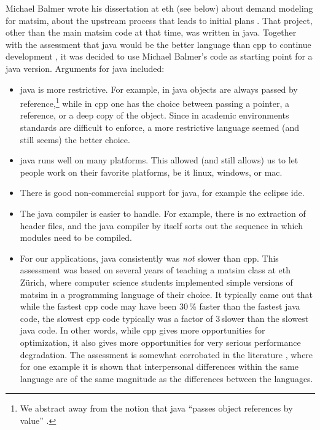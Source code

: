 Michael Balmer wrote his dissertation at \gls{eth} (see below) about demand modeling for \gls{matsim}, \ie about the upstream process that leads to initial plans
\citep{Balmer2007phd}.  That project, other than the main \gls{matsim} code at that time, was written in \gls{java}.  Together with the assessment that \gls{java} would be the better language than \gls{cpp} to continue development%
, it was decided to use Michael Balmer's code as starting point for a \gls{java} version.  Arguments for \gls{java} included:
%
\begin{itemize}\styleItemize
\item  \gls{java} is more restrictive. For example, in \gls{java} objects are always passed by reference,\footnote{%
%
We abstract away from the notion that \gls{java} ``passes object references by value'' \citep{...}.
%
} while in \gls{cpp} one has the choice between passing a pointer, a reference, or a deep copy of the object.  Since in academic environments standards are difficult to enforce, a more restrictive language seemed (and still seems) the better choice.

\item \gls{java} runs well on many platforms.  This allowed (and still allows) us to let people work on their favorite platforms, be it \gls{linux}, \gls{windows}, or \gls{mac}.

\item There is good non-commercial support for \gls{java}, for example the \gls{eclipse} \gls{ide}.

\item The \gls{java} compiler is easier to handle.  For example, there is no extraction of header files, and the \gls{java} compiler by itself sorts out the sequence in which modules need to be compiled.

\item For our applications, \gls{java} consistently was \emph{not} slower than \gls{cpp}.  This assessment was based on several years of teaching a \gls{matsim} class at \gls{eth} Zürich, where computer science students implemented simple versions of \gls{matsim} in a programming language of their choice.  It typically came out that while the fastest \gls{cpp} code may have been 30\,\% faster than the fastest \gls{java} code, the slowest \gls{cpp} code typically was a factor of 3\,slower than the slowest \gls{java} code.  In other words, while \gls{cpp} gives more opportunities for optimization, it also gives more opportunities for very serious performance degradation.  The assessment is somewhat corrobated in the literature \citep{Prechelt1999EfficiencyJavaVsCpp}, where for one example it is shown that interpersonal differences within the same language are of the same magnitude as the differences between the languages.


\end{itemize}

